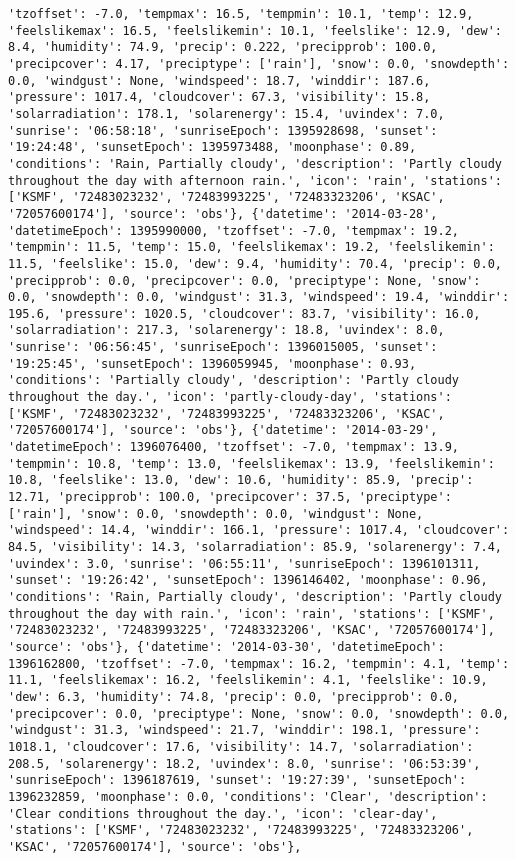 \documentclass[
  letterpaper,
  DIV=11,
  numbers=noendperiod]{scrartcl}
\begin{document}
\begin{verbatim}
'tzoffset': -7.0, 'tempmax': 16.5, 'tempmin': 10.1, 'temp': 12.9, 'feelslikemax': 16.5, 'feelslikemin': 10.1, 'feelslike': 12.9, 'dew': 8.4, 'humidity': 74.9, 'precip': 0.222, 'precipprob': 100.0, 'precipcover': 4.17, 'preciptype': ['rain'], 'snow': 0.0, 'snowdepth': 0.0, 'windgust': None, 'windspeed': 18.7, 'winddir': 187.6, 'pressure': 1017.4, 'cloudcover': 67.3, 'visibility': 15.8, 'solarradiation': 178.1, 'solarenergy': 15.4, 'uvindex': 7.0, 'sunrise': '06:58:18', 'sunriseEpoch': 1395928698, 'sunset': '19:24:48', 'sunsetEpoch': 1395973488, 'moonphase': 0.89, 'conditions': 'Rain, Partially cloudy', 'description': 'Partly cloudy throughout the day with afternoon rain.', 'icon': 'rain', 'stations': ['KSMF', '72483023232', '72483993225', '72483323206', 'KSAC', '72057600174'], 'source': 'obs'}, {'datetime': '2014-03-28', 'datetimeEpoch': 1395990000, 'tzoffset': -7.0, 'tempmax': 19.2, 'tempmin': 11.5, 'temp': 15.0, 'feelslikemax': 19.2, 'feelslikemin': 11.5, 'feelslike': 15.0, 'dew': 9.4, 'humidity': 70.4, 'precip': 0.0, 'precipprob': 0.0, 'precipcover': 0.0, 'preciptype': None, 'snow': 0.0, 'snowdepth': 0.0, 'windgust': 31.3, 'windspeed': 19.4, 'winddir': 195.6, 'pressure': 1020.5, 'cloudcover': 83.7, 'visibility': 16.0, 'solarradiation': 217.3, 'solarenergy': 18.8, 'uvindex': 8.0, 'sunrise': '06:56:45', 'sunriseEpoch': 1396015005, 'sunset': '19:25:45', 'sunsetEpoch': 1396059945, 'moonphase': 0.93, 'conditions': 'Partially cloudy', 'description': 'Partly cloudy throughout the day.', 'icon': 'partly-cloudy-day', 'stations': ['KSMF', '72483023232', '72483993225', '72483323206', 'KSAC', '72057600174'], 'source': 'obs'}, {'datetime': '2014-03-29', 'datetimeEpoch': 1396076400, 'tzoffset': -7.0, 'tempmax': 13.9, 'tempmin': 10.8, 'temp': 13.0, 'feelslikemax': 13.9, 'feelslikemin': 10.8, 'feelslike': 13.0, 'dew': 10.6, 'humidity': 85.9, 'precip': 12.71, 'precipprob': 100.0, 'precipcover': 37.5, 'preciptype': ['rain'], 'snow': 0.0, 'snowdepth': 0.0, 'windgust': None, 'windspeed': 14.4, 'winddir': 166.1, 'pressure': 1017.4, 'cloudcover': 84.5, 'visibility': 14.3, 'solarradiation': 85.9, 'solarenergy': 7.4, 'uvindex': 3.0, 'sunrise': '06:55:11', 'sunriseEpoch': 1396101311, 'sunset': '19:26:42', 'sunsetEpoch': 1396146402, 'moonphase': 0.96, 'conditions': 'Rain, Partially cloudy', 'description': 'Partly cloudy throughout the day with rain.', 'icon': 'rain', 'stations': ['KSMF', '72483023232', '72483993225', '72483323206', 'KSAC', '72057600174'], 'source': 'obs'}, {'datetime': '2014-03-30', 'datetimeEpoch': 1396162800, 'tzoffset': -7.0, 'tempmax': 16.2, 'tempmin': 4.1, 'temp': 11.1, 'feelslikemax': 16.2, 'feelslikemin': 4.1, 'feelslike': 10.9, 'dew': 6.3, 'humidity': 74.8, 'precip': 0.0, 'precipprob': 0.0, 'precipcover': 0.0, 'preciptype': None, 'snow': 0.0, 'snowdepth': 0.0, 'windgust': 31.3, 'windspeed': 21.7, 'winddir': 198.1, 'pressure': 1018.1, 'cloudcover': 17.6, 'visibility': 14.7, 'solarradiation': 208.5, 'solarenergy': 18.2, 'uvindex': 8.0, 'sunrise': '06:53:39', 'sunriseEpoch': 1396187619, 'sunset': '19:27:39', 'sunsetEpoch': 1396232859, 'moonphase': 0.0, 'conditions': 'Clear', 'description': 'Clear conditions throughout the day.', 'icon': 'clear-day', 'stations': ['KSMF', '72483023232', '72483993225', '72483323206', 'KSAC', '72057600174'], 'source': 'obs'}, 
\end{verbatim}
\end{document}
